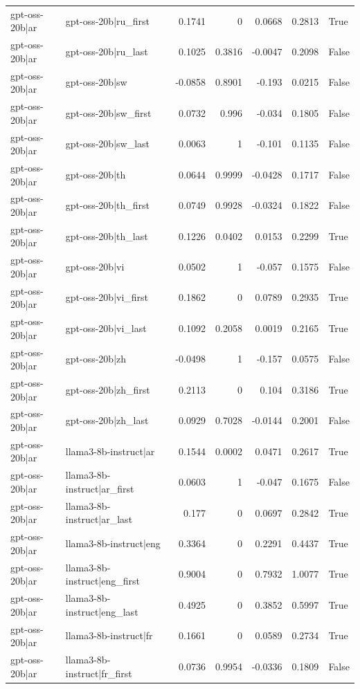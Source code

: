 \begin{table}
\begin{tabular}{l l r r r r l}
gpt-oss-20b|ar & gpt-oss-20b|ru_first & 0.1741 & 0 & 0.0668 & 0.2813 & True \\
gpt-oss-20b|ar & gpt-oss-20b|ru_last & 0.1025 & 0.3816 & -0.0047 & 0.2098 & False \\
gpt-oss-20b|ar & gpt-oss-20b|sw & -0.0858 & 0.8901 & -0.193 & 0.0215 & False \\
gpt-oss-20b|ar & gpt-oss-20b|sw_first & 0.0732 & 0.996 & -0.034 & 0.1805 & False \\
gpt-oss-20b|ar & gpt-oss-20b|sw_last & 0.0063 & 1 & -0.101 & 0.1135 & False \\
gpt-oss-20b|ar & gpt-oss-20b|th & 0.0644 & 0.9999 & -0.0428 & 0.1717 & False \\
gpt-oss-20b|ar & gpt-oss-20b|th_first & 0.0749 & 0.9928 & -0.0324 & 0.1822 & False \\
gpt-oss-20b|ar & gpt-oss-20b|th_last & 0.1226 & 0.0402 & 0.0153 & 0.2299 & True \\
gpt-oss-20b|ar & gpt-oss-20b|vi & 0.0502 & 1 & -0.057 & 0.1575 & False \\
gpt-oss-20b|ar & gpt-oss-20b|vi_first & 0.1862 & 0 & 0.0789 & 0.2935 & True \\
gpt-oss-20b|ar & gpt-oss-20b|vi_last & 0.1092 & 0.2058 & 0.0019 & 0.2165 & True \\
gpt-oss-20b|ar & gpt-oss-20b|zh & -0.0498 & 1 & -0.157 & 0.0575 & False \\
gpt-oss-20b|ar & gpt-oss-20b|zh_first & 0.2113 & 0 & 0.104 & 0.3186 & True \\
gpt-oss-20b|ar & gpt-oss-20b|zh_last & 0.0929 & 0.7028 & -0.0144 & 0.2001 & False \\
gpt-oss-20b|ar & llama3-8b-instruct|ar & 0.1544 & 0.0002 & 0.0471 & 0.2617 & True \\
gpt-oss-20b|ar & llama3-8b-instruct|ar_first & 0.0603 & 1 & -0.047 & 0.1675 & False \\
gpt-oss-20b|ar & llama3-8b-instruct|ar_last & 0.177 & 0 & 0.0697 & 0.2842 & True \\
gpt-oss-20b|ar & llama3-8b-instruct|eng & 0.3364 & 0 & 0.2291 & 0.4437 & True \\
gpt-oss-20b|ar & llama3-8b-instruct|eng_first & 0.9004 & 0 & 0.7932 & 1.0077 & True \\
gpt-oss-20b|ar & llama3-8b-instruct|eng_last & 0.4925 & 0 & 0.3852 & 0.5997 & True \\
gpt-oss-20b|ar & llama3-8b-instruct|fr & 0.1661 & 0 & 0.0589 & 0.2734 & True \\
gpt-oss-20b|ar & llama3-8b-instruct|fr_first & 0.0736 & 0.9954 & -0.0336 & 0.1809 & False \\

\end{tabular}
\end{table}
